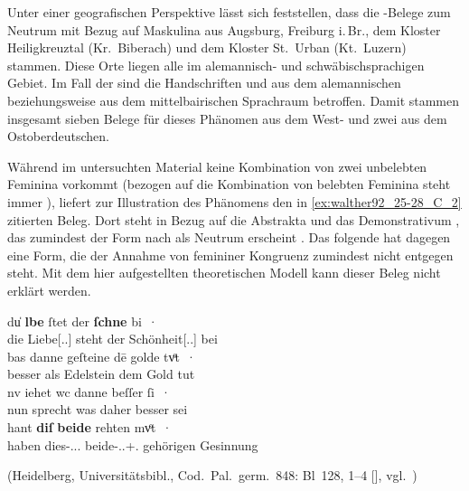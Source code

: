 Unter einer geografischen Perspektive lässt sich feststellen, dass die
\CAO{}-Belege zum Neutrum mit Bezug auf Maskulina aus Augsburg,
Freiburg i.\,Br., dem Kloster Heiligkreuztal (Kr.~Biberach) und dem Kloster
St.~Urban (Kt.~Luzern) stammen. Diese Orte liegen alle im alemannisch- und
schwäbischsprachigen Gebiet. Im Fall der \citet{kc} sind die Handschriften
\citet{kc:K} und \citet{kc:B1} aus dem alemannischen beziehungsweise aus dem
mittelbairischen Sprachraum betroffen. Damit stammen insgesamt sieben Belege
für dieses Phänomen aus dem West- und zwei aus dem Ost\-ober\-deutschen.

Während im untersuchten Material keine Kombination von zwei unbelebten Feminina
vorkommt (bezogen auf die Kombination von belebten Feminina steht immer
), liefert \citet[384]{paul2007} zur Illustration des Phänomens
den in \cref{ex:walther92_25-28_C_2} zitierten Beleg. Dort steht in Bezug auf
die Abstrakta   und   das
Demonstrativum  , das zumindest der Form nach als
Neutrum erscheint \autocite[485]{ksw2}. Das folgende  hat dagegen
eine Form, die der Annahme von femininer Kongruenz zumindest nicht entgegen
steht. Mit dem hier aufgestellten theoretischen Modell kann dieser Beleg nicht
erklärt werden.

\begin{exe}
\ex\label{ex:walther92_25-28_C_2}
	\gll du̍ \textbf{lbe} ſtet der \textbf{ſchne} bi~· \\
		die Liebe[\Nom.\Sg.\FemI] steht der Schönheit[\Dat.\Sg.\FemI] bei \\
\sn \gll bas danne geſteine dē golde tvͦt~· \\
		besser als Edelstein dem Gold tut \\
\sn \gll nv iehet wc danne beſſer ſi~· \\
		nun sprecht was daher besser sei \\
\sn \gll hant \textbf{diſ} \textbf{beide} rehten mvͦt~· \\
		haben dies-\Nom.\Pl.\NeutI{}.\St{} beide-\Nom.\Pl.\M+\F\subI.\St{} gehörigen Gesinnung \\
	\begin{taggedline}{(Heidelberg, Universitätsbibl., Cod.~Pal.~germ.~848: Bl~128\rb, 1--4 [\cite[4957]{hsc}], vgl.~\cite[356--358]{bein2013})}
	\trans {}
	\end{taggedline}
	\\
\end{exe}


